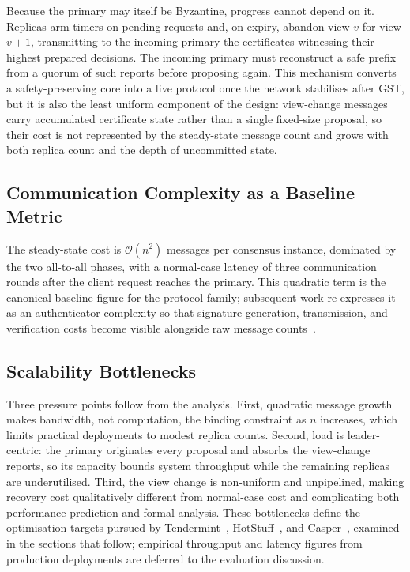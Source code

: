 Because the primary may itself be Byzantine, progress cannot depend on it. Replicas arm timers on pending requests and, on expiry, abandon view $v$ for view $v+1$, transmitting to the incoming primary the certificates witnessing their highest prepared decisions. The incoming primary must reconstruct a safe prefix from a quorum of such reports before proposing again. This mechanism converts a safety-preserving core into a live protocol once the network stabilises after GST, but it is also the least uniform component of the design: view-change messages carry accumulated certificate state rather than a single fixed-size proposal, so their cost is not represented by the steady-state message count and grows with both replica count and the depth of uncommitted state.

\subsection{Communication Complexity as a Baseline Metric}

The steady-state cost is $\mathcal{O}(n^2)$ messages per consensus instance, dominated by the two all-to-all phases, with a normal-case latency of three communication rounds after the client request reaches the primary. This quadratic term is the canonical baseline figure for the protocol family; subsequent work re-expresses it as an authenticator complexity so that signature generation, transmission, and verification costs become visible alongside raw message counts~\cite{yin2019hotstuff}.

\subsection{Scalability Bottlenecks}

Three pressure points follow from the analysis. First, quadratic message growth makes bandwidth, not computation, the binding constraint as $n$ increases, which limits practical deployments to modest replica counts. Second, load is leader-centric: the primary originates every proposal and absorbs the view-change reports, so its capacity bounds system throughput while the remaining replicas are underutilised. Third, the view change is non-uniform and unpipelined, making recovery cost qualitatively different from normal-case cost and complicating both performance prediction and formal analysis. These bottlenecks define the optimisation targets pursued by Tendermint~\cite{buchman2016tendermint}, HotStuff~\cite{yin2019hotstuff}, and Casper~\cite{buterin2020combining}, examined in the sections that follow; empirical throughput and latency figures from production deployments are deferred to the evaluation discussion.